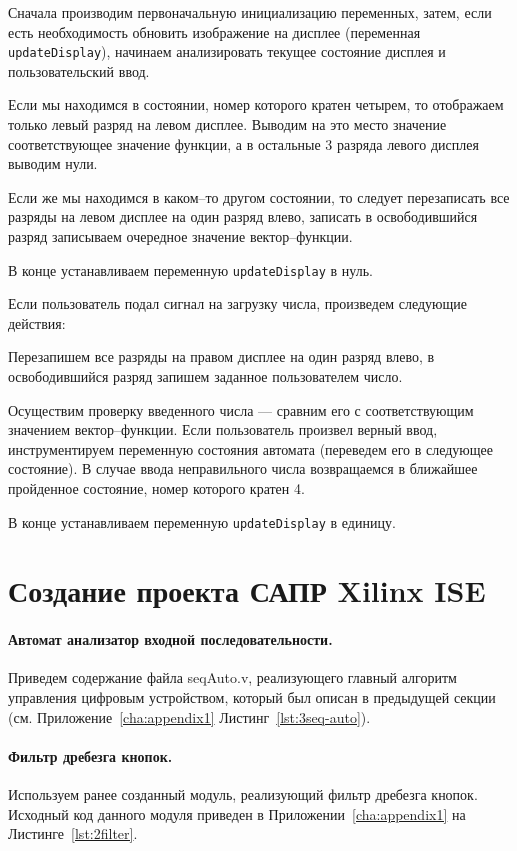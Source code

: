 Сначала производим первоначальную инициализацию переменных, затем, если есть необходимость обновить изображение на дисплее (переменная \texttt{updateDisplay}), начинаем анализировать текущее состояние дисплея и пользовательский ввод. 

Если мы находимся в состоянии, номер которого кратен четырем, то отображаем только левый разряд на левом дисплее. Выводим на это место значение соответствующее значение функции, а в остальные 3 разряда левого дисплея выводим нули.

Если же мы находимся в каком--то другом состоянии, то следует перезаписать все разряды на левом дисплее на один разряд влево, записать в освободившийся разряд записываем очередное значение вектор--функции. 

В конце устанавливаем переменную \texttt{updateDisplay} в нуль. 

Если пользователь подал сигнал на загрузку числа, произведем следующие действия:

Перезапишем все разряды на правом дисплее на один разряд влево, в освободившийся разряд запишем заданное пользователем число. 

Осуществим проверку введенного числа --- сравним его с соответствующим значением вектор--функции. Если пользователь произвел верный ввод, инструментируем переменную состояния автомата (переведем его в следующее состояние). В случае ввода неправильного числа возвращаемся в ближайшее пройденное состояние, номер которого кратен 4. 

В конце устанавливаем переменную \texttt{updateDisplay} в единицу.

\section{Создание проекта САПР Xilinx ISE}

\paragraph{Автомат анализатор входной последовательности.}
Приведем содержание файла seqAuto.v, реализующего главный алгоритм управления цифровым устройством, который был описан в предыдущей секции (см. Приложение~\ref{cha:appendix1} Листинг~\ref{lst:3seq-auto}).


\paragraph{Фильтр дребезга кнопок.}
Используем ранее созданный модуль, реализующий фильтр дребезга кнопок.
Исходный код данного модуля приведен в Приложении~\ref{cha:appendix1} на Листинге~\ref{lst:2filter}.

